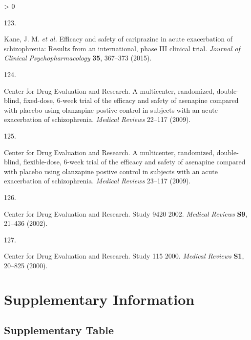 \documentclass[
  9pt,
  english,
  ,jou,floatsintext]{apa6}
\newcommand{\beginsupplement}{\setcounter{table}{0}
\renewcommand{\thetable}{S\arabic{table}}
\setcounter{figure}{0}
\renewcommand{\thefigure}{S\arabic{figure}}}
\newlength{\cslhangindent}
\newlength{\csllabelwidth}
\newenvironment{CSLReferences}[2] %
 {%
  \setlength{\parindent}{0pt}
  \ifodd #1 \everypar{\setlength{\hangindent}{\cslhangindent}}\ignorespaces\fi
  \ifnum #2 > 0
  \setlength{\parskip}{#2\baselineskip}
  \fi
 }%
 {}
\newcommand{\CSLLeftMargin}[1]{\parbox[t]{\csllabelwidth}{#1}}
\newcommand{\CSLRightInline}[1]{\parbox[t]{\linewidth - \csllabelwidth}{#1}\break}
\begin{document}
\begin{CSLReferences}{0}{0}
\leavevmode\hypertarget{ref-Kane2015a}{}%
\CSLLeftMargin{123. }
\CSLRightInline{Kane, J. M. \emph{et al.} Efficacy and safety of cariprazine in acute exacerbation of schizophrenia: Results from an international, phase III clinical trial. \emph{Journal of Clinical Psychopharmacology} \textbf{35}, 367--373 (2015).}

\leavevmode\hypertarget{ref-Hera2009a}{}%
\CSLLeftMargin{124. }
\CSLRightInline{Center for Drug Evaluation and Research. A multicenter, randomized, double-blind, fixed-dose, 6-week trial of the efficacy and safety of asenapine compared with placebo using olanzapine postive control in subjects with an acute exacerbation of schizophrenia. \emph{{Medical Reviews}} 22--117 (2009).}

\leavevmode\hypertarget{ref-Hera2009b}{}%
\CSLLeftMargin{125. }
\CSLRightInline{Center for Drug Evaluation and Research. A multicenter, randomized, double-blind, flexible-dose, 6-week trial of the efficacy and safety of asenapine compared with placebo using olanzapine postive control in subjects with an acute exacerbation of schizophrenia. \emph{{Medical Reviews}} 23--117 (2009).}

\leavevmode\hypertarget{ref-Study942022002}{}%
\CSLLeftMargin{126. }
\CSLRightInline{Center for Drug Evaluation and Research. Study 9420 2002. \emph{{Medical Reviews}} \textbf{S9}, 21--436 (2002).}

\leavevmode\hypertarget{ref-Study1152000}{}%
\CSLLeftMargin{127. }
\CSLRightInline{Center for Drug Evaluation and Research. Study 115 2000. \emph{{Medical Reviews}} \textbf{S1}, 20--825 (2000).}

\end{CSLReferences}

\onecolumn
\clearpage
\beginsupplement

\hypertarget{supplementary-information}{%
\section{Supplementary Information}\label{supplementary-information}}

\hypertarget{supplementary-table}{%
\subsection{Supplementary Table}\label{supplementary-table}}
\end{document}

